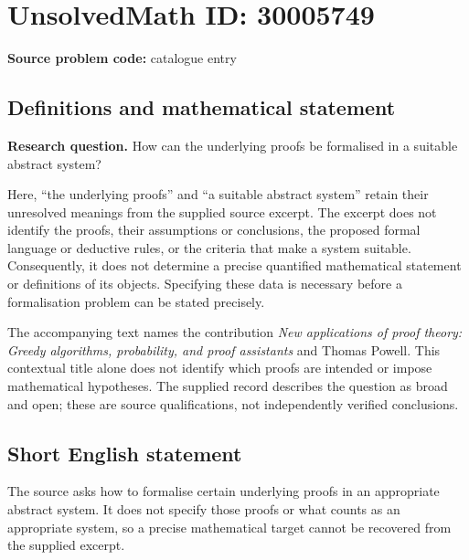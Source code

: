 \documentclass[11pt]{article}
\begin{document}
\section*{UnsolvedMath ID: 30005749}
\textbf{Source problem code:} catalogue entry
\subsection{Definitions and mathematical statement}
\textbf{Research question.} How can the underlying proofs be formalised in a suitable abstract system?

Here, ``the underlying proofs'' and ``a suitable abstract system'' retain their unresolved meanings from the supplied source excerpt. The excerpt does not identify the proofs, their assumptions or conclusions, the proposed formal language or deductive rules, or the criteria that make a system suitable. Consequently, it does not determine a precise quantified mathematical statement or definitions of its objects. Specifying these data is necessary before a formalisation problem can be stated precisely.

The accompanying text names the contribution \emph{New applications of proof theory: Greedy algorithms, probability, and proof assistants} and Thomas Powell. This contextual title alone does not identify which proofs are intended or impose mathematical hypotheses. The supplied record describes the question as broad and open; these are source qualifications, not independently verified conclusions.
\subsection{Short English statement}
The source asks how to formalise certain underlying proofs in an appropriate abstract system. It does not specify those proofs or what counts as an appropriate system, so a precise mathematical target cannot be recovered from the supplied excerpt.
\end{document}
